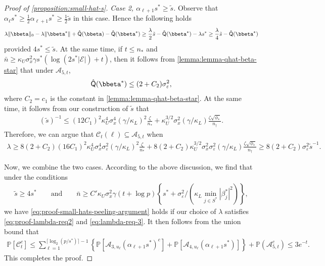 \documentclass[10pt]{article}
\numberwithin{equation}{section}
\begin{document}
\begin{proof}[Proof of \cref{proposition:small-hat-s}]
\noindent \emph{Case 2, $\alpha_{\ell+1} s^* \ge \tilde{s}$.} Observe that $\alpha_{\ell} s^* \ge \frac{1}{2} \alpha_{\ell+1} s^* \ge \frac{1}{2}\tilde{s}$ in this case. Hence the following holds
\begin{align*}
    \lambda \|\bbeta\|_0 - \lambda \|\bbeta^*\| + \hat{\mathsf{Q}}(\bbeta) - \hat{\mathsf{Q}}(\bbeta^*) \ge \frac{\lambda}{2} \tilde{s} - \hat{\mathsf{Q}}(\bbeta^*) - \lambda s^* \ge \frac{\lambda}{4} \tilde{s} - \hat{\mathsf{Q}}(\bbeta^*)
\end{align*} provided $4s^* \le \tilde{s}$. At the same time, if $t\le n_*$ and $\bar{n} \ge \kappa_U\sigma_x^2 \gamma s^*( \log(2s^*|\mathcal{E}|) + t)$, then it follows from \cref{lemma:lemma-qhat-beta-star} that under $\mathcal{A}_{5,t}$, 
\begin{align*}
    \hat{\mathsf{Q}}(\bbeta^*) \le (2 + C_2) \sigma_\varepsilon^2,
\end{align*} where $C_2 = c_1$ is the constant in \cref{lemma:lemma-qhat-beta-star}. At the same time, it follows from our construction of $\tilde{s}$ that
\begin{align*}
    (\tilde{s})^{-1} \le (12C_1)^2 \kappa_U^4\sigma_x^4 (\gamma/\kappa_L)^2 \frac{\zeta}{n_*} + \kappa_U^{3/2} \sigma_x^2 (\gamma/\kappa_L) \frac{\zeta \sqrt{\phi_*} }{n_\dagger}.
\end{align*}
Therefore, we can argue that $\mathcal{C}_{t}(\ell) \subseteq \mathcal{A}_{5,t}$ when 
\begin{align}
\label{eq:lambda-req-3}
\lambda \ge 8(2+C_2) (16C_1)^2 \kappa_U^4\sigma_x^4 \sigma_\varepsilon^2 (\gamma/\kappa_L)^2 \frac{\zeta}{n_*} + 8(2+C_2) \kappa_U^{3/2} \sigma_x^2 \sigma_\varepsilon^2 (\gamma/\kappa_L) \frac{\zeta \sqrt{\phi_*} }{n_\dagger} \ge 8(2+C_2) \sigma_\varepsilon^2 \tilde{s}^{-1}.
\end{align}

Now, we combine the two cases. According to the above discussion, we find that under the conditions 
\begin{align*}
    \tilde{s} \ge 4s^*\qquad \text{and} \qquad \bar{n} \ge C' \kappa_U\sigma_x^2 \gamma (t + \log p) \left\{ s^* +  \sigma_\varepsilon^2 / (\kappa_L \min_{j\in S^*} |\beta_j^*|^2)\right\},
\end{align*} we have \eqref{eq:proof-small-hats-peeling-argument} holds if our choice of $\lambda$ satisfies \eqref{eq:proof-lambda-req2} and \eqref{eq:lambda-req-3}. It then follows from the union bound that
\begin{align*}
    \mathbb{P}\left[\mathcal{C}_t^c\right] \le \sum_{\ell=1}^{\lceil \log_2(p/s^*) \rceil - 1} \left\{\mathbb{P}[\mathcal{A}_{3,u_\ell}(\alpha_{\ell+1} s^*)^c] + \mathbb{P}[\mathcal{A}_{4,u_\ell} (\alpha_{\ell+1} s^*)] \right\}+ \mathbb{P}(\mathcal{A}_{5,t}^c) \le 3e^{-t}.
\end{align*} This completes the proof.

\end{proof}
\end{document}

